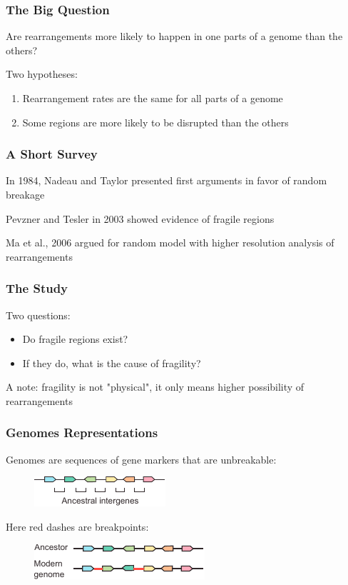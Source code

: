 \documentclass[svgnames,14pt]{beamer}
\begin{document}
\begin{frame}
\frametitle{The Big Question}
Are rearrangements more likely to happen in one parts of a genome than the others?
\pause

\vspace{12pt}
Two hypotheses:
\begin{enumerate}
\item Rearrangement rates are the same for all parts of a genome
\item Some regions are more likely to be disrupted than the others
\end{enumerate}
\end{frame}

\begin{frame}
\frametitle{A Short Survey}
In 1984, Nadeau and Taylor presented first arguments in favor of random breakage

\pause
\vspace{12pt}
Pevzner and Tesler in 2003 showed evidence of fragile regions

\pause
\vspace{12pt}
Ma et al., 2006 argued for random model with higher resolution analysis of rearrangements 
\end{frame}

\begin{frame}
\frametitle{The Study}
Two questions:
\begin{itemize}
\item Do fragile regions exist?
\item If they do, what is the cause of fragility?
\end{itemize}

\vspace{12pt}
A note: fragility is not "physical", it only means higher possibility of rearrangements
\end{frame}

\begin{frame}
\frametitle{Genomes Representations}
Genomes are sequences of gene markers that are unbreakable:
\begin{figure}
	\centering
	\includegraphics[scale = 2.20]{Intergenes.pdf}
\end{figure}
\pause
\vspace{12pt}
Here red dashes are breakpoints:
\begin{figure}
	\centering
	\includegraphics[scale = 2.20]{Breakpoint.pdf}
\end{figure}
\end{frame}
\end{document}
